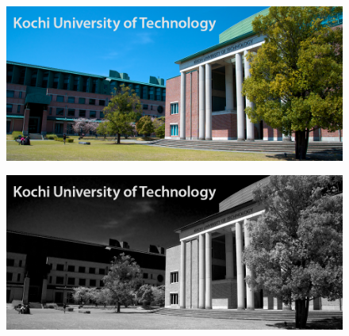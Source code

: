 \section{\result}
\newcommand{\axisfig}[1]{
    \begin{tikzpicture}
        \node (fig){\texttt{[image: \#1]}};
        \node[left] at ($(fig.south west)!0.5!(fig.north west)+(0.2cm,0)$){\rotatebox{90}{\tiny \texttt{frequency}}};
        \node[below] at ($(fig.south west)!0.5!(fig.south east)+(0,0.2cm)$){\rotatebox{0}{\tiny \texttt{frequency}}};
    \end{tikzpicture}
    \vspace{-1em}
}
\begin{figure}[H]
    \centering
    \begin{minipage}[b]{.19\textwidth}
        \centering
        \includegraphics[keepaspectratio,width=\textwidth]{../../kut.jpg}
        \label{fig:元画像}
    \end{minipage}
    \begin{minipage}[b]{.19\textwidth}
        \centering
        \includegraphics[keepaspectratio,width=\textwidth]{../../Figures/05_11_r.png}
    \end{minipage}
    \begin{minipage}[b]{.19\textwidth}
        \centering

\end{minipage}
\end{figure}
